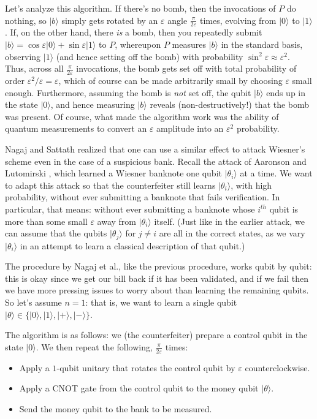 \documentclass[12pt]{report}
\theoremstyle{plain}
\theoremstyle{definition}
\newcommand{\eps}{\varepsilon}
\renewcommand{\ket}[1]{|#1\rangle}
\begin{document}
Let's analyze this algorithm.  If there's no bomb, then the invocations of $P$ do nothing, so $\ket{b}$ simply gets rotated by an $\eps$ angle $\frac{\pi}{2 \eps}$ times, evolving from $\ket{0}$ to $\ket{1}$.  If, on the other hand, there {\em is} a bomb, then you repeatedly submit $\ket{b} = \cos\eps \ket{0} + \sin\eps \ket{1}$ to $P$, whereupon $P$ measures $\ket{b}$ in the standard basis, observing $\ket{1}$ (and hence setting off the bomb) with probability $\sin^2 \eps \approx \eps^2$.  Thus, across all $\frac{\pi}{2 \eps}$ invocations, the bomb gets set off with total probability of order $\eps^2 / \eps = \eps$, which of course can be made arbitrarily small by choosing $\eps$ small enough.  Furthermore, assuming the bomb is {\em not} set off, the qubit $\ket{b}$ ends up in the state $\ket{0}$, and hence measuring $\ket{b}$ reveals (non-destructively!) that the bomb was present.  Of course, what made the algorithm work was the ability of quantum measurements to convert an $\eps$ amplitude into an $\eps^2$ probability.

Nagaj and Sattath \cite{NS14} realized that one can use a similar effect to attack Wiesner's scheme even in the case of a suspicious bank.  Recall the attack of Aaronson \cite{Aar09} and Lutomirski \cite{lutomirski:attack}, which learned a Wiesner banknote one qubit $\ket{\theta_i}$ at a time.  We want to adapt this attack so that the counterfeiter still learns $\ket{\theta_i}$, with high probability, without ever submitting a banknote that fails verification.  In particular, that means: without ever submitting a banknote whose $i^{th}$ qubit is more than some small $\eps$ away from $\ket{\theta_i}$ itself.  (Just like in the earlier attack, we can assume that the qubits $\ket{\theta_j}$ for $j\neq i$ are all in the correct states, as we vary $\ket{\theta_i}$ in an attempt to learn a classical description of that qubit.)

The procedure by Nagaj et al., like the previous procedure, works qubit by qubit: this is okay since we get our bill back if it has been validated, and if we fail then we have more pressing issues to worry about than learning the remaining qubits.  So let's assume $n=1$: that is, we want to learn a single qubit $\ket\theta \in \{\ket 0, \ket 1, \ket +,\ket -\}$.

The algorithm is as follows: we (the counterfeiter) prepare a control qubit in the state $\ket{0}$.  We then repeat the following, $\frac{\pi}{2 \eps}$ times:

\begin{itemize}
\item Apply a $1$-qubit unitary that rotates the control qubit by $\eps$ counterclockwise.
\item Apply a CNOT gate from the control qubit to the money qubit $\ket{\theta}$.
\item Send the money qubit to the bank to be measured.
\end{itemize}
\end{document}
